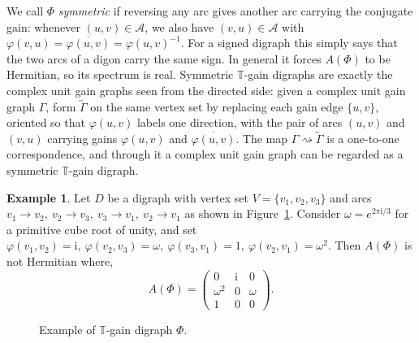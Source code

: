 \documentclass[12pt]{article}
\theoremstyle{definition}
\newtheorem{example}[theorem]{Example}
\begin{document}
We call $\Phi$ \emph{symmetric} if reversing any arc gives another arc carrying the conjugate gain: whenever $(u,v)\in \mathcal{A}$, we also have $(v,u)\in \mathcal{A}$ with $\varphi(v,u)=\overline{\varphi(u,v)}=\varphi(u,v)^{-1}$. For a signed digraph this simply says that the two arcs of a digon carry the same sign. In general it forces $A(\Phi)$ to be Hermitian, so its spectrum is real. Symmetric $\mathbb{T}$-gain digraphs are exactly the complex unit gain graphs seen from the directed side: given a complex unit gain graph $\Gamma$, form $\overleftrightarrow{\Gamma}$ on the same vertex set by replacing each gain edge $\{u,v\}$, oriented so that $\varphi(u,v)$ labels one direction, with the pair of arcs $(u,v)$ and $(v,u)$ carrying gains $\varphi(u,v)$ and $\overline{\varphi(u,v)}$. The map $\Gamma\rightsquigarrow \overleftrightarrow{\Gamma}$ is a one-to-one correspondence, and through it a complex unit gain graph can be regarded as a symmetric $\mathbb{T}$-gain digraph.

\begin{example}\label{ex:running}
Let $D$ be a digraph with vertex set $V = \{v_1,v_2,v_3\}$ and arcs
$v_1 \to v_2,\ v_2 \to v_3,\ v_3 \to v_1,\ v_2 \to v_1$ as shown in Figure~\ref{fig:running}. Consider
$\omega = e^{2\pi \mathrm{i}/3}$ for a primitive cube root of unity, and set
\(
  \varphi(v_1,v_2) = \mathrm{i},\
  \varphi(v_2,v_3) = \omega,\
  \varphi(v_3,v_1) = 1,\
  \varphi(v_2,v_1) = \omega^{2}
\).
 Then $A(\Phi)$ is not Hermitian where,
\[
  A(\Phi) =
  \begin{pmatrix}
    0 & \mathrm{i} & 0 \\
    \omega^{2} & 0 & \omega \\
    1 & 0 & 0
  \end{pmatrix}.
\]

\begin{figure}[ht]
\centering
{}
\caption{Example of $\mathbb{T}$-gain digraph $\Phi$.}
\label{fig:running}
\end{figure}
\end{example}
\end{document}
